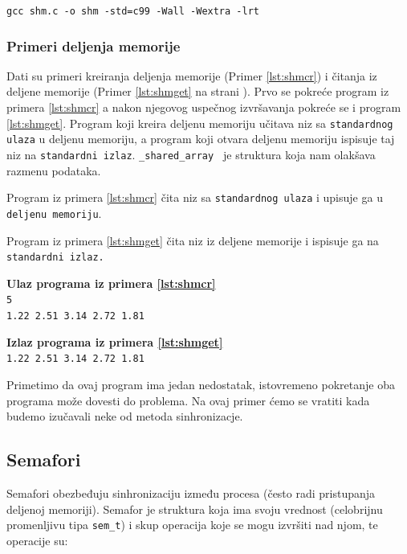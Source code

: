 \documentclass[a4paper, 11pt]{article}
\newcommand{\scode}[3] {
	\hspace{.06\textwidth} 
	\begin{minipage}[t]{.88\textwidth} %
		\begin{mdframed}[topline=true,bottomline=true,leftline=true,rightline=true,backgroundcolor=gray!22, linecolor=gray!60!black,roundcorner=1mm]
			 

	\begin{center}
		\caption{\textbf{Primer \ref{lst:#3}:} #2}
	\end{center}
	\end{mdframed}
	\end{minipage}

}
\newcommand{\stdio}[4] {
	\hspace{.06\textwidth} 
	\begin{minipage}[t]{.88\textwidth} %
		\begin{mdframed}[backgroundcolor=black!7,topline=true,bottomline=true,leftline=true,rightline=true,roundcorner=1mm]
		\begin{minipage}[t]{.5\textwidth} %
			\textbf{#1} \\
				\texttt{#3}
		\end{minipage}
		\begin{minipage}[t]{.5\textwidth} %
			\textbf{#2} \\
				\texttt{#4}
		\end{minipage}
		\end{mdframed}
	\end{minipage}
	\vspace{3mm} 
}
\begin{document}
 \begin{center}
	\texttt{gcc shm.c -o shm -std=c99 -Wall -Wextra -lrt} 
\end{center}
\newpage
\subsubsection{Primeri deljenja memorije}

Dati su primeri kreiranja deljenja memorije (Primer \ref{lst:shmcr}) i čitanja iz deljene memorije (Primer \ref{lst:shmget} na strani \pageref{lst:shmget}). Prvo se pokreće program iz primera \ref{lst:shmcr} a nakon njegovog uspečnog izvršavanja pokreće se i program \ref{lst:shmget}. Program koji kreira deljenu memoriju učitava niz sa \texttt{standardnog ulaza} u deljenu memoriju, a program koji otvara deljenu memoriju ispisuje taj niz na \texttt{standardni izlaz}. \texttt{\_shared\_array } je struktura koja nam olakšava razmenu podataka.
\vspace{2mm} 

\scode{shmcreate.c}{Kreiranje deljene memorije}{shmcr}

\vspace{5mm} 
Program iz primera \ref{lst:shmcr} čita niz sa \texttt{standardnog ulaza} i upisuje ga u \texttt{deljenu memoriju}.

\newpage
Program iz primera \ref{lst:shmget} čita niz iz deljene memorije i ispisuje ga na \texttt{standardni izlaz.} 
\vspace{1mm} 

\scode{shmget.c}{Otvaranje deljene memorije}{shmget}
\stdio{Ulaz programa iz primera \ref{lst:shmcr}}{Izlaz programa iz primera \ref{lst:shmget}}{5\\ 1.22 2.51 3.14 2.72 1.81}{1.22 2.51 3.14 2.72 1.81}

\vspace{2mm} 
Primetimo da ovaj program ima jedan nedostatak, istovremeno pokretanje oba programa može dovesti do problema. Na ovaj primer ćemo se vratiti kada budemo izučavali neke od metoda sinhronizacje.

\newpage
\subsection{Semafori}

Semafori obezbeđuju sinhronizaciju između procesa (često radi pristupanja deljenoj memoriji). Semafor je struktura koja ima svoju vrednost (celobrijnu promenljivu tipa \texttt{sem\_t}) i skup operacija koje se mogu izvršiti nad njom, te operacije su: 
\vspace{-2mm} 
\end{document}
